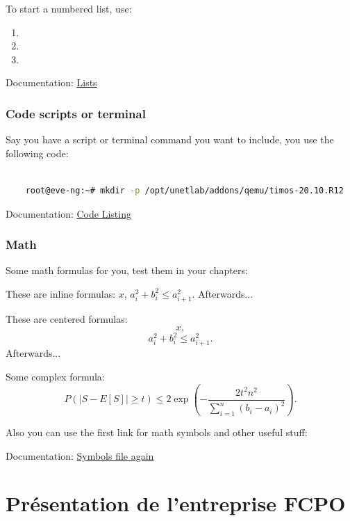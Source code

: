To start a numbered list, use:

\begin{enumerate}
    \item 
    \item 
    \item 
\end{enumerate}



Documentation: \href{https://www.overleaf.com/learn/latex/Lists}{Lists}


\subsubsection{Code scripts or terminal}

Say you have a script or terminal command you want to include, you use the following code:

    \lstset{style=mystyle} %
    
    \begin{lstlisting}[language=bash, caption= Code caption]
    
    root@eve-ng:~# mkdir -p /opt/unetlab/addons/qemu/timos-20.10.R12

    \end{lstlisting}


Documentation: \href{https://www.overleaf.com/learn/latex/Code_listing}{Code Listing}

\subsubsection{Math}

Some math formulas for you, test them in your chapters:

These are inline formulas: $x$, $a_i^2 + b_i^2 \le a_{i+1}^2$. Afterwards...

These are centered formulas: $$x,$$ $$a_i^2 + b_i^2 \le a_{i+1}^2.$$ Afterwards...

Some complex formula: $$P(|S - E[S]| \ge t) \le 2 \exp \left( -\frac{2 t^2 n^2}{\sum_{i = 1}^n (b_i - a_i)^2} \right).$$

Also you can use the first link for math symbols and other useful stuff:

Documentation: \href{https://www.cmor-faculty.rice.edu/~heinken/latex/symbols.pdf}{Symbols file again}



\newpage


\section{Présentation de l’entreprise FCPO}



